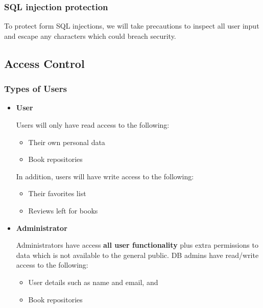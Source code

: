 \documentclass[letter, 12pt, titlepage]{article}
\begin{document}
			\subsubsection{SQL injection protection}
				To protect form SQL injections, we will take precautions to inspect all user input and escape any characters which could breach security.

		\subsection{Access Control}

			\subsubsection{Types of Users}
				\begin{itemize}
		
					\item \textbf{User}
						

						Users will only have read access to the following:
						\begin{itemize}
							\item  Their own personal data
							\item  Book repositories
						\end{itemize}


					 In addition, users will have write access to the following:
						\begin{itemize}
							\item  Their favorites list
							\item  Reviews left for books
						\end{itemize}

					\item \textbf{Administrator}

						Administrators have access \textbf{all user functionality} plus extra permissions to data which is not available to the general public. DB admins have read/write access to the following: 			\begin{itemize}
				\item User details such as name and email, and
				\item Book repositories
		  \end{itemize}
				\end{itemize}
\end{document}
